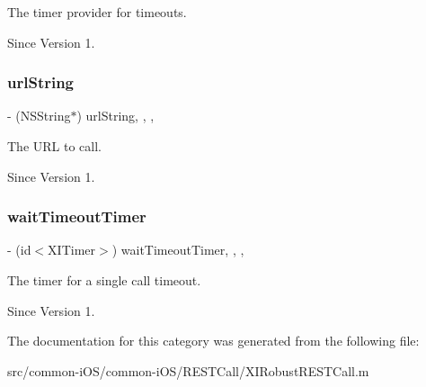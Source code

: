 The timer provider for timeouts. 

\begin{DoxySince}{Since}
Version 1. 
\end{DoxySince}
\hypertarget{category_x_i_robust_r_e_s_t_call_07_08_ade598ca3442f11fbf8667b7322ac6bc8}{}\label{category_x_i_robust_r_e_s_t_call_07_08_ade598ca3442f11fbf8667b7322ac6bc8} 
\subsubsection{\texorpdfstring{url\+String}{urlString}}
{\footnotesize\ttfamily -\/ (N\+S\+String$\ast$) url\+String\hspace{0.3cm}{\ttfamily [read]}, {\ttfamily [write]}, {\ttfamily [nonatomic]}, {\ttfamily [strong]}}



The U\+RL to call. 

\begin{DoxySince}{Since}
Version 1. 
\end{DoxySince}
\hypertarget{category_x_i_robust_r_e_s_t_call_07_08_ac719a5af700e85389765512407704b9c}{}\label{category_x_i_robust_r_e_s_t_call_07_08_ac719a5af700e85389765512407704b9c} 
\subsubsection{\texorpdfstring{wait\+Timeout\+Timer}{waitTimeoutTimer}}
{\footnotesize\ttfamily -\/ (id$<$X\+I\+Timer$>$) wait\+Timeout\+Timer\hspace{0.3cm}{\ttfamily [read]}, {\ttfamily [write]}, {\ttfamily [nonatomic]}, {\ttfamily [strong]}}



The timer for a single call timeout. 

\begin{DoxySince}{Since}
Version 1. 
\end{DoxySince}


The documentation for this category was generated from the following file\+:\begin{DoxyCompactItemize}
\item 
src/common-\/i\+O\+S/common-\/i\+O\+S/\+R\+E\+S\+T\+Call/X\+I\+Robust\+R\+E\+S\+T\+Call.\+m\end{DoxyCompactItemize}
